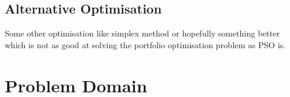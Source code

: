 \documentclass{pdfmx4020}
\begin{document}


  \section{Alternative Optimisation} %
  \label{sec:alternative_optimisation}
    Some other optimisation like simplex method or hopefully something better which is not as good at solving the portfolio optimisation problem as PSO is. 




    

  

  

\chapter{Problem Domain}
  
\end{document}
